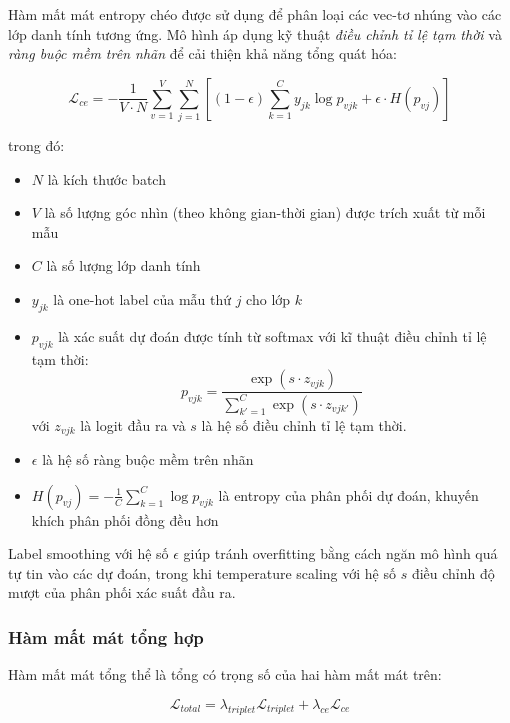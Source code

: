 Hàm mất mát entropy chéo được sử dụng để phân loại các vec-tơ nhúng vào các lớp danh tính tương ứng. Mô hình áp dụng kỹ thuật \textit{điều chỉnh tỉ lệ tạm thời} và \textit{ràng buộc mềm trên nhãn} để cải thiện khả năng tổng quát hóa:

\begin{equation}
  \mathcal{L}_{ce} = -\frac{1}{V \cdot N} \sum_{v=1}^{V} \sum_{j=1}^{N} \left[ (1-\epsilon) \sum_{k=1}^{C} y_{jk} \log p_{vjk} + \epsilon \cdot H(p_{vj}) \right]
\end{equation}

\noindent trong đó:
\begin{itemize}
  \item $N$ là kích thước batch
  \item $V$ là số lượng góc nhìn (theo không gian-thời gian) được trích xuất từ mỗi mẫu
  \item $C$ là số lượng lớp danh tính
  \item $y_{jk}$ là one-hot label của mẫu thứ $j$ cho lớp $k$
  \item $p_{vjk}$ là xác suất dự đoán được tính từ softmax với kĩ thuật điều chỉnh tỉ lệ tạm thời:
        \begin{equation}
          p_{vjk} = \frac{\exp(s \cdot z_{vjk})}{\sum_{k'=1}^{C} \exp(s \cdot z_{vj k'})}
        \end{equation}
        với $z_{vjk}$ là logit đầu ra và $s$ là hệ số điều chỉnh tỉ lệ tạm thời.
  \item $\epsilon$ là hệ số ràng buộc mềm trên nhãn
  \item $H(p_{vj}) = -\frac{1}{C}\sum_{k=1}^{C} \log p_{vjk}$ là entropy của phân phối dự đoán, khuyến khích phân phối đồng đều hơn
\end{itemize}

Label smoothing với hệ số $\epsilon$ giúp tránh overfitting bằng cách ngăn mô hình quá tự tin vào các dự đoán, trong khi temperature scaling với hệ số $s$ điều chỉnh độ mượt của phân phối xác suất đầu ra.

\subsubsection{Hàm mất mát tổng hợp}

Hàm mất mát tổng thể là tổng có trọng số của hai hàm mất mát trên:

\begin{equation}
  \mathcal{L}_{total} = \lambda_{triplet} \mathcal{L}_{triplet} + \lambda_{ce} \mathcal{L}_{ce}
\end{equation}

